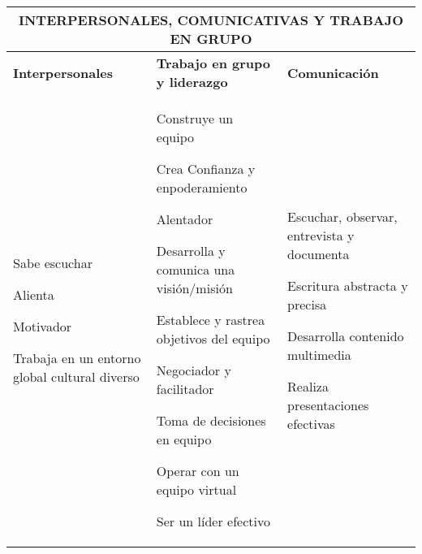 \begin{center}
\begin{tabularx}{\textwidth}{|X|X|X|} \hline
\multicolumn{3}{|c|}{\textbf{INTERPERSONALES, COMUNICATIVAS Y TRABAJO EN GRUPO}} \\ \hline
\textbf{Interpersonales} & \textbf{Trabajo en grupo y liderazgo} & \textbf{Comunicación} \\ \hline

\begin{capenv}
\item Sabe escuchar
\item Alienta
\item Motivador
\item Trabaja en un entorno global cultural diverso
\end{capenv}
&
\begin{capenv}
\item Construye un equipo
\item Crea Confianza y enpoderamiento
\item Alentador
\item Desarrolla y comunica una visión/misión
\item Establece y rastrea objetivos del equipo
\item Negociador y facilitador
\item Toma de decisiones en equipo
\item Operar con un equipo virtual
\item Ser un líder efectivo
\end{capenv}
&
\begin{capenv}
\item Escuchar, observar, entrevista y documenta
\item Escritura abstracta y precisa
\item Desarrolla contenido multimedia
\item Realiza presentaciones efectivas
\end{capenv} \\ \hline

\end{tabularx}
\end{center}

